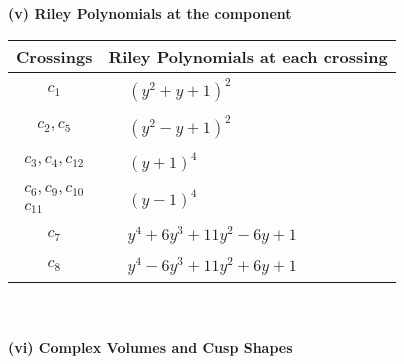 \documentclass[1p]{elsarticle_modified}
\theoremstyle{definition}
\begin{document}
\newpage\renewcommand{\arraystretch}{1}
\flushleft \textbf{(v) Riley Polynomials at the component}\newline \\
\begin{tabular}{m{50pt}|m{274pt}}
Crossings & \hspace{64pt}Riley Polynomials at each crossing \\
\hline $$\begin{aligned}c_{1}\end{aligned}$$&$\begin{aligned}
&(y^2+y+1)^2
\end{aligned}$\\
\hline $$\begin{aligned}c_{2},c_{5}\end{aligned}$$&$\begin{aligned}
&(y^2- y+1)^2
\end{aligned}$\\
\hline $$\begin{aligned}c_{3},c_{4},c_{12}\end{aligned}$$&$\begin{aligned}
&(y+1)^4
\end{aligned}$\\
\hline $$\begin{aligned}c_{6},c_{9},c_{10}\\c_{11}\end{aligned}$$&$\begin{aligned}
&(y-1)^4
\end{aligned}$\\
\hline $$\begin{aligned}c_{7}\end{aligned}$$&$\begin{aligned}
&y^4+6 y^3+11 y^2-6 y+1
\end{aligned}$\\
\hline $$\begin{aligned}c_{8}\end{aligned}$$&$\begin{aligned}
&y^4-6 y^3+11 y^2+6 y+1
\end{aligned}$\\
\hline
\end{tabular}\\~\\
\newpage\flushleft \textbf{(vi) Complex Volumes and Cusp Shapes}
\end{document}
